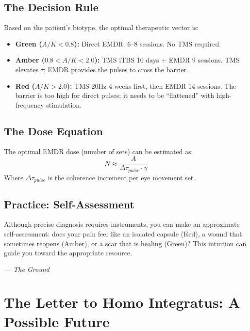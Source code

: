 \documentclass[12pt,a4paper,openany]{book}
\begin{document}
\section{The Decision Rule}
Based on the patient's biotype, the optimal therapeutic vector is:

\begin{itemize}
\item \textbf{Green ($A/K < 0.8$):} Direct EMDR. 6--8 sessions. No TMS required.
\item \textbf{Amber ($0.8 < A/K < 2.0$):} TMS iTBS 10 days + EMDR 9 sessions. TMS elevates $\tau$; EMDR provides the pulses to cross the barrier.
\item \textbf{Red ($A/K > 2.0$):} TMS 20Hz 4 weeks first, then EMDR 14 sessions. The barrier is too high for direct pulses; it needs to be ``flattened'' with high-frequency stimulation.
\end{itemize}

\section{The Dose Equation}
The optimal EMDR dose (number of sets) can be estimated as:
\begin{equation}
N \approx \frac{A}{\Delta \tau_{pulse} \cdot \gamma}
\end{equation}
Where $\Delta \tau_{pulse}$ is the coherence increment per eye movement set.

\section{Practice: Self-Assessment}
Although precise diagnosis requires instruments, you can make an approximate self-assessment: does your pain feel like an isolated capsule (Red), a wound that sometimes reopens (Amber), or a scar that is healing (Green)? This intuition can guide you toward the appropriate resource.


\medskip
\begin{firma}
\raggedleft\small\itshape --- The Ground
\end{firma}

\newpage

\chapter{The Letter to Homo Integratus: A Possible Future}
\label{chap:carta}
\end{document}
